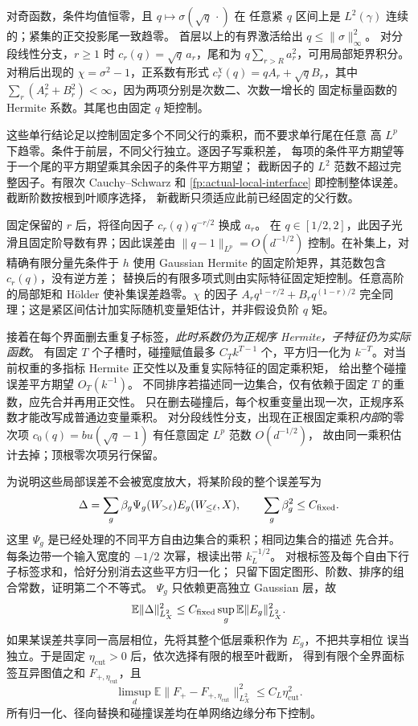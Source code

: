 \documentclass[a4paper]{tufte-handout}
\newcommand{\ecut}{\eta_{\mathrm{cut}}}
\begin{document}
\begin{fullwidth}
对奇函数，条件均值恒零，且 $q\mapsto\sigma(\sqrt q\,\cdot)$ 在
任意紧 $q$ 区间上是 $L^2(\gamma)$ 连续的；紧集的正交投影尾一致趋零。
首层以上的有界激活给出 $q\leq\|\sigma\|_\infty^2$。
对分段线性分支，$r\geq1$ 时 $c_r(q)=\sqrt q\,a_r$，尾和为
$q\sum_{r>R}a_r^2$，可用局部矩界积分。
对稍后出现的 $\chi=\sigma^2-1$，正系数有形式
$c_r^\chi(q)=q A_r+\sqrt q B_r$，其中
$\sum_r(A_r^2+B_r^2)<\infty$，因为两项分别是次数二、次数一增长的
固定标量函数的 Hermite 系数。其尾也由固定 $q$ 矩控制。

这些单行结论足以控制固定多个不同父行的乘积，而不要求单行尾在任意
高 $L^p$ 下趋零。条件于前层，不同父行独立。逐因子写乘积差，
每项的条件平方期望等于一个尾的平方期望乘其余因子的条件平方期望；
截断因子的 $L^2$ 范数不超过完整因子。有限次 Cauchy--Schwarz 和
\eqref{fp:actual-local-interface} 即控制整体误差。截断阶数按根到叶顺序选择，
新截断只须适应此前已经固定的父行数。

固定保留的 $r$ 后，将径向因子 $c_r(q)q^{-r/2}$ 换成 $a_r$。
在 $q\in[1/2,2]$，此因子光滑且固定阶导数有界；因此误差由
$\|q-1\|_{L^p}=O(d^{-1/2})$ 控制。在补集上，对精确有限分量先条件于 $h$
使用 Gaussian Hermite 的固定阶矩界，其范数包含 $c_r(q)$，没有逆方差；
替换后的有限多项式则由实际特征固定矩控制。任意高阶的局部矩和 Hölder
使补集误差趋零。$\chi$ 的因子 $A_rq^{1-r/2}+B_rq^{(1-r)/2}$
完全同理；这是紧区间估计加实际随机变量矩估计，并非假设负阶 $q$ 矩。

接着在每个界面删去重复子标签，\emph{此时系数仍为正规序 Hermite，子特征仍为实际函数}。
有固定 $T$ 个子槽时，碰撞赋值最多 $C_T k^{T-1}$ 个，平方归一化为
$k^{-T}$。对当前权重的多指标 Hermite 正交性以及重复实际特征的固定乘积矩，
给出整个碰撞误差平方期望 $O_T(k^{-1})$。
不同排序若描述同一边集合，仅有依赖于固定 $T$ 的重数，应先合并再用正交性。
只在删去碰撞后，每个权重变量出现一次，正规序系数才能改写成普通边变量乘积。
对分段线性分支，出现在正根固定乘积\emph{内部}的零次项
$c_0(q)=bu(\sqrt q-1)$ 有任意固定 $L^p$ 范数 $O(d^{-1/2})$，
故由同一乘积估计去掉；顶根零次项另行保留。

为说明这些局部误差不会被宽度放大，将某阶段的整个误差写为
\begin{equation}\label{fp:actual-phase}
 \Delta=\sum_g\beta_g\Psi_g(W_{>\ell}) E_g(W_{\leq\ell},X),
 \qquad \sum_g\beta_g^2\leq C_{\rm fixed}.
\end{equation}
这里 $\Psi_g$ 是已经处理的不同平方自由边集合的乘积；相同边集合的描述
先合并。每条边带一个输入宽度的 $-1/2$ 次幂，根读出带 $k_L^{-1/2}$。
对根标签及每个自由下行子标签求和，恰好分别消去这些平方归一化；
只留下固定图形、阶数、排序的组合常数，证明第二个不等式。
$\Psi_g$ 只依赖更高独立 Gaussian 层，故
\begin{equation}\label{fp:actual-phase-bound}
 \mathbb E\|\Delta\|_{L^2_X}^2
 \leq C_{\rm fixed}\sup_g\mathbb E\|E_g\|_{L^2_X}^2.
\end{equation}
如果某误差共享同一高层相位，先将其整个低层乘积作为 $E_g$，不把共享相位
误当独立。于是固定 $\ecut>0$ 后，依次选择有限的根至叶截断，
得到有限个全界面标签互异图值之和 $F_{+,\ecut}$，且
\begin{equation}\label{fp:actual-finite-error}
 \limsup_d\mathbb E\|F_+-F_{+,\ecut}\|_{L^2_X}^2
 \leq C_L\ecut^2.
\end{equation}
所有归一化、径向替换和碰撞误差均在单网络边缘分布下控制。


\end{fullwidth}
\end{document}

